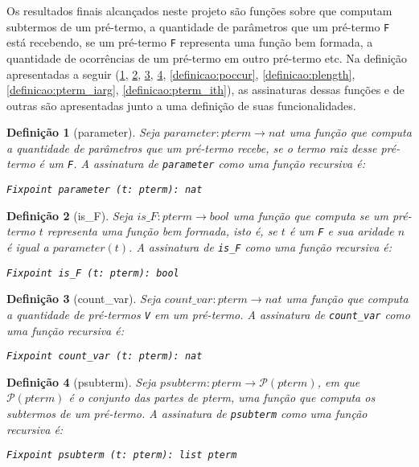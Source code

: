 \documentclass{article}
\newtheorem{definicao}{Definição}
\begin{document}
Os resultados finais alcançados neste projeto são funções sobre que computam subtermos de um pré-termo,
a quantidade de parâmetros que um pré-termo \texttt{F} está recebendo, se um pré-termo \texttt{F}
representa uma função bem formada, a quantidade de ocorrências de um pré-termo em outro pré-termo etc.
Na definição apresentadas a seguir (\ref{definicao:parameter}, \ref{definicao:is_F}, \ref{definicao:count_var}, \ref{definicao:psubterm}, \ref{definicao:poccur}, \ref{definicao:plength}, \ref{definicao:pterm_iarg}, \ref{definicao:pterm_ith}), as assinaturas dessas funções e de outras são apresentadas junto a uma definição de suas funcionalidades.

\begin{definicao}[parameter]
	Seja $parameter: pterm \rightarrow nat$ uma função que computa a quantidade de parâmetros que um
	pré-termo recebe, se o termo raiz desse pré-termo é um \texttt{F}. A assinatura de
	\texttt{parameter} como uma função recursiva é:

	\texttt{Fixpoint parameter (t: pterm): nat}
	\label{definicao:parameter}
\end{definicao}

\begin{definicao}[is\_F]
	Seja $is\_F: pterm \rightarrow bool$ uma função que computa se um pré-termo $t$ representa uma
	função bem formada, isto é, se $t$ é um \texttt{F} e sua aridade $n$ é igual a $parameter(t)$. A
	assinatura de \texttt{is\_F} como uma função recursiva é:

	\texttt{Fixpoint is\_F (t: pterm): bool}
	\label{definicao:is_F}
\end{definicao}

\begin{definicao}[count\_var]
	Seja $count\_var: pterm \rightarrow nat$ uma função que computa a quantidade de pré-termos
	\texttt{V} em um pré-termo. A assinatura de \texttt{count\_var} como uma função recursiva é:

	\texttt{Fixpoint count\_var (t: pterm): nat}
	\label{definicao:count_var}
\end{definicao}

\begin{definicao}[psubterm]
	Seja $psubterm: pterm \rightarrow \mathcal{P}(pterm)$, em que $\mathcal{P}(pterm)$ é o conjunto das
	partes de pterm, uma função que computa os subtermos de um pré-termo. A assinatura de
	\texttt{psubterm} como uma função recursiva é:

	\texttt{Fixpoint psubterm (t: pterm): list pterm}
	\label{definicao:psubterm}
\end{definicao}
\end{document}
